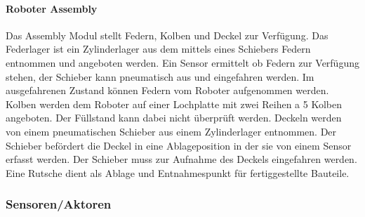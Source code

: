 \documentclass{article}
\begin{document}
\paragraph{Roboter Assembly}
Das Assembly Modul stellt Federn, Kolben und Deckel zur Verfügung. Das Federlager ist ein Zylinderlager aus dem mittels eines Schiebers Federn entnommen und angeboten werden. Ein Sensor ermittelt ob Federn zur Verfügung stehen, der Schieber kann pneumatisch aus und eingefahren werden. Im ausgefahrenen Zustand können Federn vom Roboter aufgenommen werden.\newline
Kolben werden dem Roboter auf einer Lochplatte mit zwei Reihen a 5 Kolben angeboten. Der Füllstand kann dabei nicht überprüft werden.\newline
Deckeln werden von einem pneumatischen Schieber aus einem Zylinderlager entnommen. Der Schieber befördert die Deckel in eine Ablageposition in der sie von einem Sensor erfasst werden. Der Schieber muss zur Aufnahme des Deckels eingefahren werden.\newline
Eine Rutsche dient als Ablage und Entnahmespunkt für fertiggestellte Bauteile.
\subsubsection{Sensoren/Aktoren}
\end{document}
